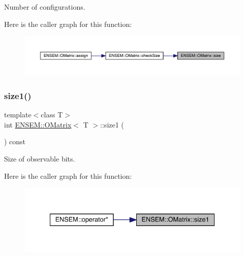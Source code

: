 Number of configurations. 

Here is the caller graph for this function\+:\nopagebreak
\begin{figure}[H]
\begin{center}
\leavevmode
\includegraphics[width=350pt]{dd/d80/classENSEM_1_1OMatrix_a837821b951450cd49d3db25f566f5e47_icgraph}
\end{center}
\end{figure}
\mbox{\label{classENSEM_1_1OMatrix_a850b4d2a93be69f82df4a2d0165bc397}} 
\subsubsection{\texorpdfstring{size1()}{size1()}\hspace{0.1cm}{\footnotesize\ttfamily [1/2]}}
{\footnotesize\ttfamily template$<$class T$>$ \\
int \mbox{\hyperlink{classENSEM_1_1OMatrix}{E\+N\+S\+E\+M\+::\+O\+Matrix}}$<$ T $>$\+::size1 (\begin{DoxyParamCaption}{ }\end{DoxyParamCaption}) const\hspace{0.3cm}{\ttfamily [inline]}}



Size of observable bits. 

Here is the caller graph for this function\+:\nopagebreak
\begin{figure}[H]
\begin{center}
\leavevmode
\includegraphics[width=335pt]{dd/d80/classENSEM_1_1OMatrix_a850b4d2a93be69f82df4a2d0165bc397_icgraph}
\end{center}
\end{figure}
\mbox{\label{classENSEM_1_1OMatrix_a850b4d2a93be69f82df4a2d0165bc397}} 
